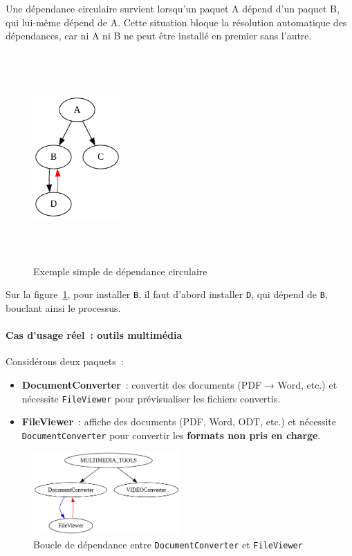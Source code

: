 Une dépendance circulaire survient lorsqu’un paquet A dépend d’un paquet B, qui lui-même dépend de A. Cette situation bloque la résolution automatique des dépendances, car ni A ni B ne peut être installé en premier sans l’autre.

\begin{figure}[H]
  \centering
  \includegraphics[width=0.3\textwidth, height=8cm]{images_pfe/CERCULARDEP.png}
  \caption{Exemple simple de dépendance circulaire}
  \label{fig:circular-dep}
\end{figure}



Sur la figure~\textcolor{blue}{\ref{fig:circular-dep}}, pour installer \texttt{B}, il faut d’abord installer \texttt{D}, qui dépend de \texttt{B}, bouclant ainsi le processus.

\paragraph{Cas d’usage réel : outils multimédia}
Considérons deux paquets :
\begin{itemize}
  \item \textbf{DocumentConverter} : convertit des documents (PDF → Word, etc.) et nécessite \texttt{FileViewer} pour prévisualiser les fichiers convertis.
  \item \textbf{FileViewer} : affiche des documents (PDF, Word, ODT, etc.) et nécessite \texttt{DocumentConverter} pour convertir les \textbf{formats non pris en charge}.
\end{itemize}

\begin{figure}[H]
  \centering
  \includegraphics[width=0.5\textwidth]{images_pfe/depcycleexemple.png}
  \caption{Boucle de dépendance entre \texttt{DocumentConverter} et \texttt{FileViewer}}
  \label{fig:depcycle-multimedia}
\end{figure}



